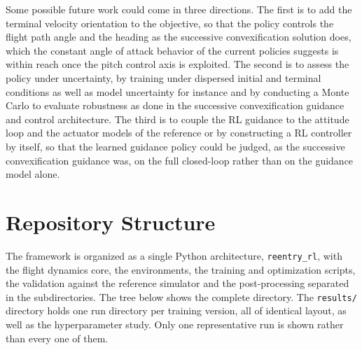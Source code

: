\documentclass[11pt]{article}
\begin{document}
Some possible future work could come in three directions. The first is to add the terminal velocity orientation to the objective, so that the policy controls the flight path angle and the heading as the successive convexification solution does, which the constant angle of attack behavior of the current policies suggests is within reach once the pitch control axis is exploited. The second is to assess the policy under uncertainty, by training under dispersed initial and terminal conditions as well as model uncertainty for instance and by conducting a Monte Carlo to evaluate robustness as done in the successive convexification guidance and control architecture. The third is to couple the RL guidance to the attitude loop and the actuator models of the reference or by constructing a RL controller by itself, so that the learned guidance policy could be judged, as the successive convexification guidance was, on the full closed-loop rather than on the guidance model alone.

\appendix

\section{Repository Structure}
\label{sec:appendix}

The framework is organized as a single Python architecture, \texttt{reentry\_rl}, with the flight dynamics core, the environments, the training and optimization scripts, the validation against the reference simulator and the post-processing separated in the subdirectories. The tree below shows the complete directory. The \texttt{results/} directory holds one run directory per training version, all of identical layout, as well as the hyperparameter study. Only one representative run is shown rather than every one of them.
\end{document}
